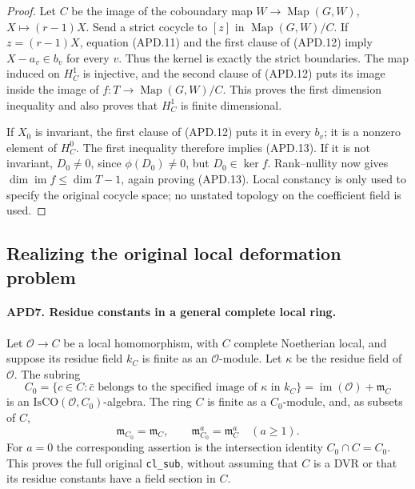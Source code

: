 \documentclass[11pt,a4paper]{article}
\numberwithin{equation}{section}
\theoremstyle{remark}\newtheorem{remark}[theorem]{Remark}
\begin{document}
\begin{proof}
Let \(C\) be the image of the coboundary map
\(W\to\operatorname{Map}(G,W)\), \(X\mapsto(r-1)X\).
Send a strict cocycle to \([z]\) in
\(\operatorname{Map}(G,W)/C\).  If \(z=(r-1)X\), equation
(APD.11) and the first clause of (APD.12) imply
\(X-a_v\in b_v\) for every \(v\).  Thus the kernel is
exactly the strict boundaries.  The map induced on \(H^1_C\)
is injective, and the second clause of (APD.12) puts its image
inside the image of
\(f:T\to\operatorname{Map}(G,W)/C\).
This proves the first dimension inequality and also proves that
\(H^1_C\) is finite dimensional.

If \(X_0\) is invariant, the first clause of (APD.12) puts it
in every \(b_v\); it is a nonzero element of \(H^0_C\).
The first inequality therefore implies (APD.13).  If it is not
invariant, \(D_0\ne0\), since \(\phi(D_0)\ne0\), but
\(D_0\in\ker f\).  Rank--nullity now gives
\(\dim\operatorname{im}f\le\dim T-1\), again proving
(APD.13).  Local constancy is only used to specify the original
cocycle space; no unstated topology on the coefficient field is used.
\end{proof}

\subsection{Realizing the original local deformation problem}

\paragraph{APD7. Residue constants in a general complete local ring.}
\label{claim:APD7}
Let \(\mathcal O\to C\) be a local homomorphism, with \(C\)
complete Noetherian local, and suppose its residue field \(k_C\)
is finite as an \(\mathcal O\)-module.  Let \(\kappa\) be
the residue field of \(\mathcal O\).  The subring
\[
 C_0=\{c\in C:\bar c\text{ belongs to the specified image of }
                         \kappa\text{ in }k_C\}
       =\operatorname{im}(\mathcal O)+\mathfrak m_C          \tag{APD.14}
\]
is an \(\mathrm{IsCO}(\mathcal O,C_0)\)-algebra.  The ring
\(C\) is finite as a \(C_0\)-module, and, as subsets of \(C\),
\[
 \mathfrak m_{C_0}=\mathfrak m_C,\qquad
 \mathfrak m_{C_0}^a=\mathfrak m_C^a\quad(a\ge1).
                                                               \tag{APD.15}
\]
For \(a=0\) the corresponding assertion is the intersection
identity \(C_0\cap C=C_0\).  This proves the full original
\texttt{cl\_\allowbreak sub}, without assuming that \(C\) is a DVR or that
its residue constants have a field section in \(C\).
\end{document}
